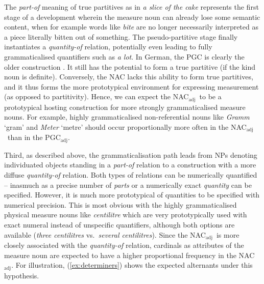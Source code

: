 \documentclass[USenglish]{article}
\newcommand{\Sub}[1]{\ensuremath{\mathrm{_{#1}}}}
\newcommand{\NACa}{NAC\Sub{adj}}
\newcommand{\PGCa}{PGC\Sub{adj}}
\begin{document}
The \textit{part-of} meaning of true partitives as in \textit{a slice of the cake} represents the first stage of a development wherein the measure noun can already lose some semantic content, when for example words like \textit{bite} are no longer necessarily interpreted as a piece literally bitten out of something.
The pseudo-partitive stage finally instantiates a \textit{quantity-of} relation, potentially even leading to fully grammaticalised quantifiers such as \textit{a lot}.
In German, the PGC is clearly the older construction \citep{Zimmer2015}.
It still has the potential to form a true partitive (if the kind noun is definite).
Conversely, the NAC lacks this ability to form true partitives, and it thus forms the more prototypical environment for expressing measurement (as opposed to partitivity).
Hence, we can expect the \NACa\ to be a prototypical hosting construction for more strongly grammaticalised measure nouns.
For example, highly grammaticalised non-referential nouns like \textit{Gramm} `gram' and \textit{Meter} `metre' should occur proportionally more often in the \NACa\ than in the \PGCa.


Third, as described above, the grammaticalisation path leads from NPs denoting individuated objects standing in a \textit{part-of} relation to a construction with a more diffuse \textit{quantity-of} relation.
Both types of relations can be numerically quantified -- inasmuch as a precise number of \textit{parts} or a numerically exact \textit{quantity} can be specified.
However, it is much more prototypical of quantities to be specified with numerical precision.
This is most obvious with the highly grammaticalised physical measure nouns like \textit{centilitre} which are very prototypically used with exact numeral instead of unspecific quantifiers, although both options are available (\textit{three centilitres} vs.\ \textit{several centilitres}).
Since the \NACa\ is more closely associated with the \textit{quantity-of} relation, cardinals as attributes of the measure noun are expected to have a higher proportional frequency in the \NACa.
For illustration, (\ref{ex:determiners}) shows the expected alternants under this hypothesis.
\end{document}
